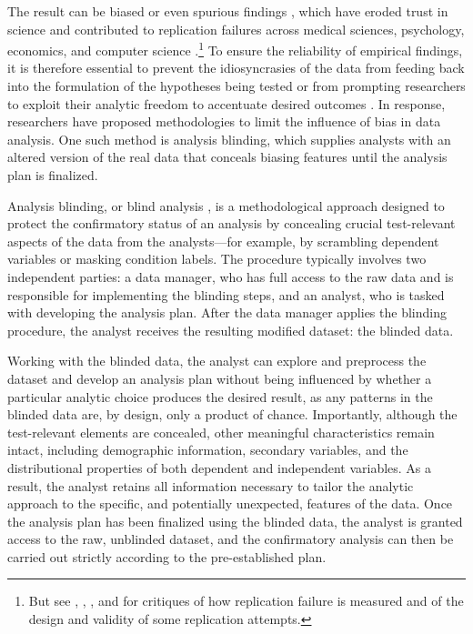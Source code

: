 The result can be biased or even spurious findings \citep{ioannidis2005most, simmons2011false, gelman2016statistical}, which have eroded trust in science and contributed to replication failures across medical sciences, psychology, economics, and computer science \citep{ioannidis2005contradicted, open2015estimating, baker2016scientists, nosek2022replicability, pashler2012editors, camerer2016evaluating, cockburn2020threats}.\footnote{But see \citet{gilbert2016}, \citet{muradchanian2021best}, \citet{savitz2024responding}, and \citet{mcshane2024statistical} for critiques of how replication failure is measured and of the design and validity of some replication attempts.} To ensure the reliability of empirical findings, it is therefore essential to prevent the idiosyncrasies of the data from feeding back into the formulation of the hypotheses being tested \citep[HARKing,][]{kerr1998harking} or from prompting researchers to exploit their analytic freedom to accentuate desired outcomes \citep{simmons2011false}. In response, researchers have proposed methodologies to limit the influence of bias in data analysis. One such method is analysis blinding, which supplies analysts with an altered version of the real data that conceals biasing features until the analysis plan is finalized.

Analysis blinding, or blind analysis \citep{maccoun2015hide, maccoun2018psychological}, is a methodological approach designed to protect the confirmatory status of an analysis by concealing crucial test-relevant aspects of the data from the analysts---for example, by scrambling dependent variables or masking condition labels. The procedure typically involves two independent parties: a data manager, who has full access to the raw data and is responsible for implementing the blinding steps, and an analyst, who is tasked with developing the analysis plan. After the data manager applies the blinding procedure, the analyst receives the resulting modified dataset: the blinded data.

Working with the blinded data, the analyst can explore and preprocess the dataset and develop an analysis plan without being influenced by whether a particular analytic choice produces the desired result, as any patterns in the blinded data are, by design, only a product of chance. Importantly, although the test-relevant elements are concealed, other meaningful characteristics remain intact, including demographic information, secondary variables, and the distributional properties of both dependent and independent variables. As a result, the analyst retains all information necessary to tailor the analytic approach to the specific, and potentially unexpected, features of the data. Once the analysis plan has been finalized using the blinded data, the analyst is granted access to the raw, unblinded dataset, and the confirmatory analysis can then be carried out strictly according to the pre-established plan.

